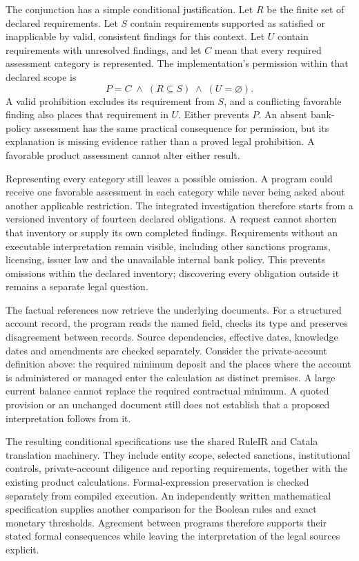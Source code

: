 The conjunction has a simple conditional justification. Let $R$ be the finite
set of declared requirements. Let $S$ contain requirements supported as satisfied
or inapplicable by valid, consistent findings for this context. Let $U$ contain
requirements with unresolved findings, and let $C$ mean that every required
assessment category is represented. The implementation's permission within
that declared scope is
\[
   P = C \;\land\; (R\subseteq S) \;\land\; (U=\varnothing).
\]
A valid prohibition excludes its requirement from $S$, and a conflicting
favorable finding also places that requirement in $U$. Either prevents $P$.
An absent bank-policy assessment has the same practical consequence for
permission, but its explanation is missing evidence rather than a proved legal
prohibition. A favorable product assessment cannot alter either result.

Representing every category still leaves a possible omission. A program could
receive one favorable assessment in each category while never being asked
about another applicable restriction. The integrated investigation therefore
starts from a versioned inventory of fourteen declared obligations. A request
cannot shorten that inventory or supply its own completed findings. Requirements
without an executable interpretation remain visible, including other sanctions
programs, licensing, issuer law and the unavailable internal bank policy. This
prevents omissions within the declared inventory; discovering every obligation
outside it remains a separate legal question.

The factual references now retrieve the underlying documents. For a structured
account record, the program reads the named field, checks its type and preserves
disagreement between records. Source dependencies, effective dates, knowledge
dates and amendments are checked separately. Consider the private-account
definition above: the required minimum deposit and the places where the account
is administered or managed enter the calculation as distinct premises. A large
current balance cannot replace the required contractual minimum. A quoted
provision or an unchanged document still does not establish that a proposed
interpretation follows from it.

The resulting conditional specifications use the shared RuleIR and Catala
translation machinery. They include entity scope, selected sanctions,
institutional controls, private-account diligence and reporting requirements,
together with the existing product calculations. Formal-expression preservation
is checked separately from compiled execution. An independently written
mathematical specification supplies another comparison for the Boolean rules
and exact monetary thresholds. Agreement between programs therefore supports
their stated formal consequences while leaving the interpretation of the legal
sources explicit.

